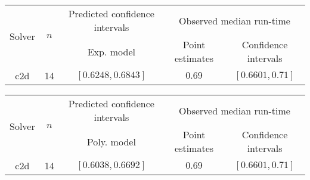 \begin{tabular}{ccccc}
\hline 
\multirow{2}{*}{Solver} & \multirow{2}{*}{$n$} & Predicted confidence intervals & \multicolumn{2}{c}{Observed median  run-time}\tabularnewline
 &  & Exp. model  & Point estimates  & Confidence intervals\tabularnewline
\hline 
\hline 
\multirow{0}{*}{c2d} & 14 & $\mathbf{\left[0.6248,0.6843\right]}$ & $0.69$ & $\left[0.6601,0.71\right]$ \tabularnewline 
\hline 
\end{tabular} 

\begin{tabular}{ccccc}
\hline 
\multirow{2}{*}{Solver} & \multirow{2}{*}{$n$} & Predicted confidence intervals & \multicolumn{2}{c}{Observed median  run-time}\tabularnewline
 &  & Poly. model  & Point estimates  & Confidence intervals\tabularnewline
\hline 
\hline 
\multirow{0}{*}{c2d} & 14 & $\mathbf{\left[0.6038,0.6692\right]}$ & $0.69$ & $\left[0.6601,0.71\right]$ \tabularnewline 
\hline 
\end{tabular} 



